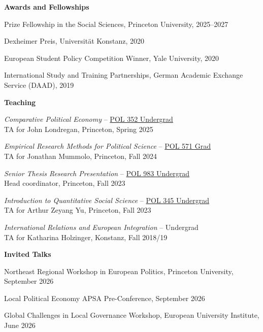 \documentclass[letterpaper,10pt,oneside]{article}
\begin{document}
\vspace{2ex}

{\large \textbf{Awards and Fellowships}}

Prize Fellowship in the Social Sciences, Princeton University, 2025--2027

Dexheimer Preis, Universität Konstanz, 2020

European Student Policy Competition Winner, Yale University, 2020

International Study and Training Partnerships, German
Academic Exchange Service (DAAD), 2019

\vspace{2ex}


{\large \textbf{Teaching}}

\textit{Comparative Political Economy} -- \href{https://registrar.princeton.edu/course-offerings/course-details?term=1254&courseid=005334}{POL 352 Undergrad} \\
TA for John Londregan, Princeton, Spring 2025

\textit{Empirical Research Methods for Political Science} -- \href{https://registrar.princeton.edu/course-offerings/course-details?term=1242&courseid=016490}{POL 571 Grad}\\
TA for Jonathan Mummolo, Princeton, Fall 2024

\textit{Senior Thesis Research Presentation} -- \href{https://registrar.princeton.edu/course-offerings/course-details?courseid=005494&term=1244}{POL 983 Undergrad} \\
Head coordinator, Princeton, Fall 2023

\textit{Introduction to Quantitative Social Science} -- \href{https://registrar.princeton.edu/course-offerings/course-details?term=1242&courseid=013781}{POL 345 Undergrad} \\
TA for Arthur Zeyang Yu, Princeton, Fall 2023

\textit{International Relations and European Integration} -- Undergrad \\
TA for Katharina Holzinger, Konstanz, Fall 2018/19


\vspace{2ex}

{\large \textbf{Invited Talks}}

Northeast Regional Workshop in European Politics, Princeton University, September 2026

Local Political Economy APSA Pre-Conference, September 2026

Global Challenges in Local Governance Workshop, European University Institute, June 2026
\end{document}
